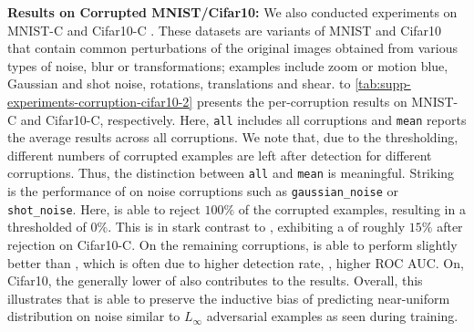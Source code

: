 \textbf{Results on Corrupted MNIST/Cifar10:}
%
We also conducted experiments on MNIST-C \citep{MuICMLWORK2019} and Cifar10-C \citep{HendrycksARXIV2019}. These datasets are variants of MNIST and Cifar10 that contain common perturbations of the original images obtained from various types of noise, blur or transformations; examples include zoom or motion blue, Gaussian and shot noise, rotations, translations and shear.  to \ref{tab:supp-experiments-corruption-cifar10-2} presents the per-corruption results on MNIST-C and Cifar10-C, respectively. Here, \texttt{all} includes all corruptions and \texttt{mean} reports the average results across all corruptions. We note that, due to the thresholding, different numbers of corrupted examples are left after detection for different corruptions. Thus, the distinction between \texttt{all} and \texttt{mean} is meaningful. Striking is the performance of \ConfTrain on noise corruptions such as \texttt{gaussian\_noise} or \texttt{shot\_noise}. Here, \ConfTrain is able to reject $100\%$ of the corrupted examples, resulting in a thresholded \TE of $0\%$. This is in stark contrast to \AdvTrain, exhibiting a \TE of roughly $15\%$ after rejection on Cifar10-C. On the remaining corruptions, \ConfTrain is able to perform slightly better than \AdvTrain, which is often due to higher detection rate, \ie, higher ROC AUC. On, Cifar10, the generally lower \TE of \ConfTrain also contributes to the results. Overall, this illustrates that \ConfTrain is able to preserve the inductive bias of predicting near-uniform distribution on noise similar to $L_\infty$ adversarial examples as seen during training.

